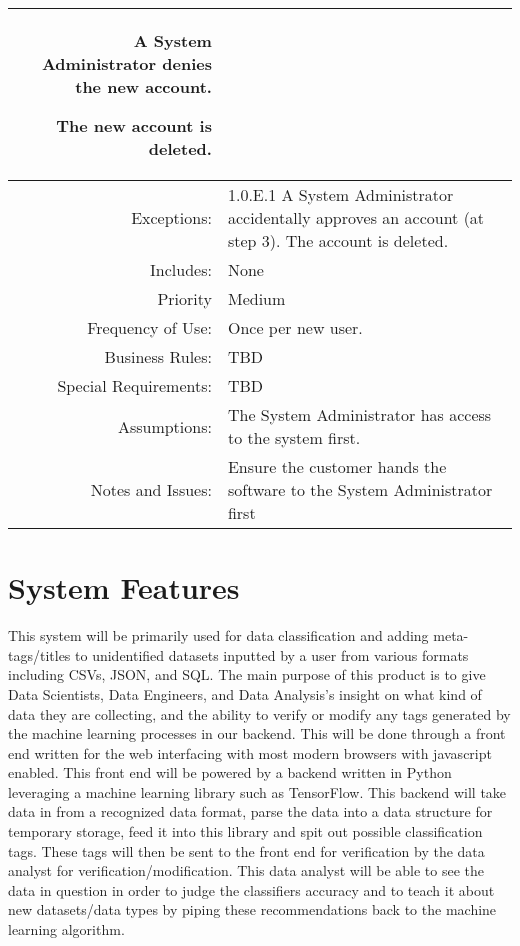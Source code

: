 \documentclass[12pt,oneside,letterpaper]{article}
\newenvironment{packed_enumerate}{ %
\vspace{-7mm}
\begin{enumerate}
  \setlength{\itemsep}{0pt}
  \setlength{\parskip}{0pt}
  \setlength{\parsep}{0pt}
}{\end{enumerate}
\vspace{-8mm}}
\begin{document}
\begin{longtable}{|r|p{3.8in}|}
\begin{packed_enumerate}
\item A System Administrator denies the new account.
\item The new account is deleted.
\end{packed_enumerate}\\
\hline
Exceptions:&1.0.E.1 A System Administrator accidentally approves an account (at step 3).\newline
The account is deleted.\\
\hline
Includes:&None\\
\hline
Priority&Medium\\
\hline
Frequency of Use:&Once per new user.\\
\hline
Business Rules:&TBD\\
\hline
Special Requirements:&TBD\\
\hline
Assumptions:&The System Administrator has access to the system first.\\
\hline
Notes and Issues:&Ensure the customer hands the software to the System Administrator first\\
\hline
\end{longtable}


\section{System Features}
This system will be primarily used for data classification and adding meta-tags/titles to unidentified datasets inputted by a user from various formats including CSVs, JSON, and SQL. The main purpose of this product is to give Data Scientists, Data Engineers, and Data Analysis's insight on what kind of data they are collecting, and the ability to verify or modify any tags generated by the machine learning processes in our backend. This will be done through a front end written for the web interfacing with most modern browsers with javascript enabled. This front end will be powered by a backend written in Python leveraging a machine learning library such as TensorFlow. This backend will take data in from a recognized data format, parse the data into a data structure for temporary storage, feed it into this library and spit out possible classification tags. These tags will then be sent to the front end for verification by the data analyst for verification/modification. This data analyst will be able to see the data in question in order to judge the classifiers accuracy and to teach it about new datasets/data types by piping these recommendations back to the machine learning algorithm.
\end{document}
